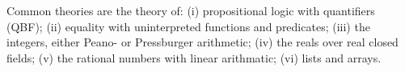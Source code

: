 \begin{remark}
    Common theories are the theory of:
    (i)  propositional logic with quantifiers (QBF);
    (ii) equality with uninterpreted functions and predicates;
    (iii) the integers, either Peano- or Pressburger arithmetic;
    (iv) the reals over real closed fields; 
    (v) the rational numbers with linear arithmatic;
    (vi) lists and arrays.
\end{remark}